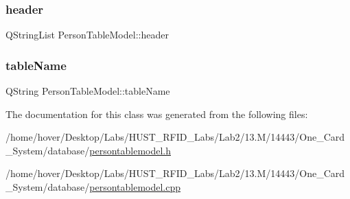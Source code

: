 \subsubsection{\texorpdfstring{header}{header}}
{\footnotesize\ttfamily Q\+String\+List Person\+Table\+Model\+::header\hspace{0.3cm}{\ttfamily [private]}}

\mbox{\label{class_person_table_model_aa9eec9359f87a39d2234dcaa324287d3}} 
\subsubsection{\texorpdfstring{tableName}{tableName}}
{\footnotesize\ttfamily Q\+String Person\+Table\+Model\+::table\+Name\hspace{0.3cm}{\ttfamily [private]}}



The documentation for this class was generated from the following files\+:\begin{DoxyCompactItemize}
\item 
/home/hover/\+Desktop/\+Labs/\+H\+U\+S\+T\+\_\+\+R\+F\+I\+D\+\_\+\+Labs/\+Lab2/13.\+M/14443/\+One\+\_\+\+Card\+\_\+\+System/database/\mbox{\hyperlink{persontablemodel_8h}{persontablemodel.\+h}}\item 
/home/hover/\+Desktop/\+Labs/\+H\+U\+S\+T\+\_\+\+R\+F\+I\+D\+\_\+\+Labs/\+Lab2/13.\+M/14443/\+One\+\_\+\+Card\+\_\+\+System/database/\mbox{\hyperlink{persontablemodel_8cpp}{persontablemodel.\+cpp}}\end{DoxyCompactItemize}
